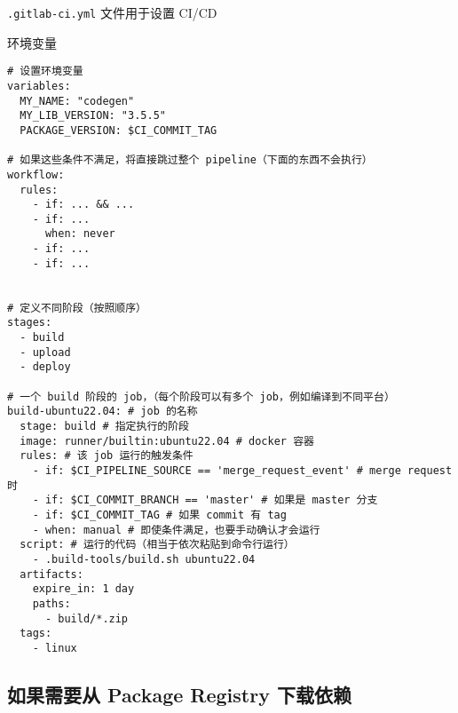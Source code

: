 
\verb`.gitlab-ci.yml` 文件用于设置 CI/CD

环境变量
\begin{lstlisting}[language=none]
# 设置环境变量
variables:
  MY_NAME: "codegen"
  MY_LIB_VERSION: "3.5.5"
  PACKAGE_VERSION: $CI_COMMIT_TAG

# 如果这些条件不满足，将直接跳过整个 pipeline（下面的东西不会执行）
workflow:
  rules:
    - if: ... && ...
    - if: ...
      when: never
    - if: ...
    - if: ...


# 定义不同阶段（按照顺序）
stages:
  - build
  - upload
  - deploy

# 一个 build 阶段的 job，（每个阶段可以有多个 job，例如编译到不同平台）
build-ubuntu22.04: # job 的名称
  stage: build # 指定执行的阶段
  image: runner/builtin:ubuntu22.04 # docker 容器
  rules: # 该 job 运行的触发条件
    - if: $CI_PIPELINE_SOURCE == 'merge_request_event' # merge request 时
    - if: $CI_COMMIT_BRANCH == 'master' # 如果是 master 分支
    - if: $CI_COMMIT_TAG # 如果 commit 有 tag
    - when: manual # 即使条件满足，也要手动确认才会运行
  script: # 运行的代码（相当于依次粘贴到命令行运行）
    - .build-tools/build.sh ubuntu22.04
  artifacts:
    expire_in: 1 day
    paths:
      - build/*.zip
  tags:
    - linux
\end{lstlisting}

\subsection{如果需要从 Package Registry 下载依赖}

